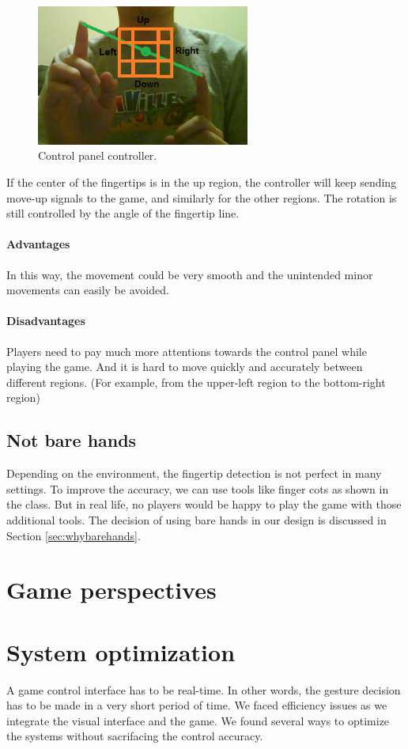 \documentclass[10pt,twocolumn,letterpaper]{article}
\begin{document}
\begin{figure}[h]
\centering
\includegraphics[width=7cm]{controlpanel.png}
\caption{Control panel controller.}
\label{fig:controlpanel}
\end{figure}

If the center of the fingertips is in the up region, the controller 
will keep sending move-up signals to the game, and similarly for the other 
regions. The rotation is still controlled by the angle of the fingertip line.
\paragraph{Advantages}
In this way, the movement could be very smooth and the unintended minor movements can easily be avoided.
\paragraph{Disadvantages}
Players need to pay much more attentions towards the control panel while playing the game. And it is hard to move quickly and accurately between different regions. (For example, from the upper-left region to the bottom-right region)

\subsection{Not bare hands}
Depending on the environment, the fingertip detection is not perfect in many settings. 
To improve the accuracy, we can use tools like finger cots as shown in the class. 
But in real life, no players would be happy to play the game with those additional tools. 
The decision of using bare hands in our design is discussed in Section \ref{sec:whybarehands}.

\section{Game perspectives}

\section{System optimization}
A game control interface has to be real-time. In other words, 
the gesture decision has to be made in a very short period of time. 
We faced efficiency issues as we integrate the visual interface and 
the game. We found several ways to optimize the systems without 
sacrifacing the control accuracy.
\end{document}
